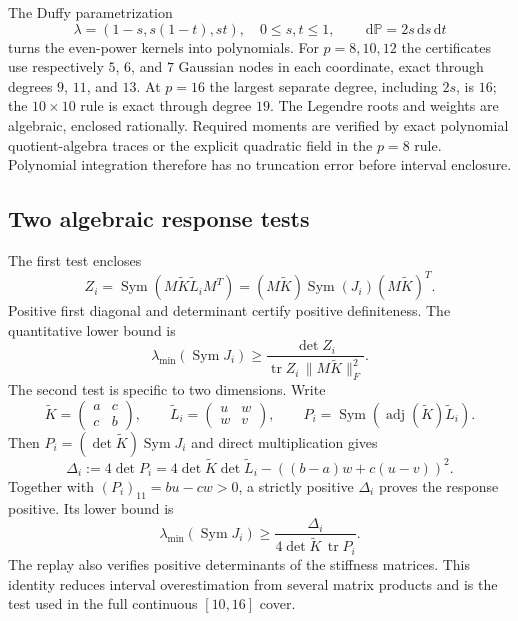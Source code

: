 \documentclass[11pt]{article}
\theoremstyle{definition}
\newcommand{\Sym}{\operatorname{Sym}}
\newcommand{\tr}{\operatorname{tr}}
\newcommand{\adj}{\operatorname{adj}}
\newcommand{\dd}{\,\mathrm d}
\begin{document}
The Duffy parametrization
\begin{equation}\label{eq:duffy}
 \lambda=(1-s,s(1-t),st),\quad 0\le s,t\le1,
 \qquad \dd\mathbb P=2s\dd s\dd t
\end{equation}
turns the even-power kernels into polynomials. For $p=8,10,12$ the
certificates use respectively $5$, $6$, and $7$ Gaussian nodes in each
coordinate, exact through degrees $9$, $11$, and $13$. At $p=16$ the
largest separate degree, including $2s$, is $16$; the $10\times10$ rule
is exact through degree $19$. The Legendre roots and weights are algebraic,
enclosed rationally. Required moments are verified by exact polynomial
quotient-algebra traces or the explicit quadratic field in the $p=8$ rule.
Polynomial integration therefore has no truncation error before interval
enclosure.

\subsection{Two algebraic response tests}
The first test encloses
\[
 Z_i=\Sym(M\widetilde K\widetilde L_iM^T)
     =(M\widetilde K)\Sym(J_i)(M\widetilde K)^T.
\]
Positive first diagonal and determinant certify positive definiteness.
The quantitative lower bound is
\begin{equation}\label{eq:congruence}
 \lambda_{\min}(\Sym J_i)\ge
 \frac{\det Z_i}{\tr Z_i\,\|M\widetilde K\|_F^2}.
\end{equation}
The second test is specific to two dimensions. Write
\[
 \widetilde K=\begin{pmatrix}a&c\\c&b\end{pmatrix},\qquad
 \widetilde L_i=\begin{pmatrix}u&w\\w&v\end{pmatrix},\qquad
 P_i=\Sym(\adj(\widetilde K)\widetilde L_i).
\]
Then $P_i=(\det\widetilde K)\Sym J_i$ and direct multiplication gives
\begin{equation}\label{eq:commutator}
 \Delta_i:=4\det P_i=
 4\det\widetilde K\det\widetilde L_i-
       ((b-a)w+c(u-v))^2.
\end{equation}
Together with $(P_i)_{11}=bu-cw>0$, a strictly positive $\Delta_i$ proves
the response positive. Its lower bound is
\begin{equation}\label{eq:commbound}
 \lambda_{\min}(\Sym J_i)\ge
       \frac{\Delta_i}{4\det\widetilde K\,\tr P_i}.
\end{equation}
The replay also verifies positive determinants of the stiffness matrices.
This identity reduces interval overestimation from several matrix products
and is the test used in the full continuous $[10,16]$ cover.
\end{document}
